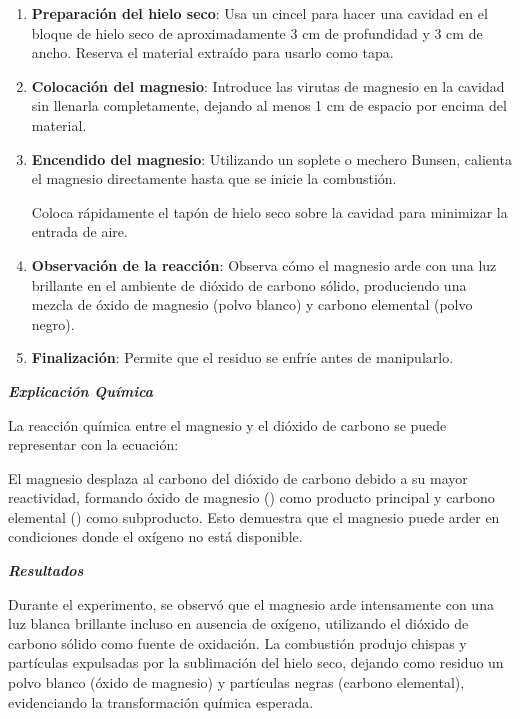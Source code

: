     \begin{enumerate}
        \item \textbf{Preparación del hielo seco}: Usa un cincel para hacer una cavidad en el bloque de hielo seco de aproximadamente 3 cm de profundidad y 3 cm de ancho. Reserva el material extraído para usarlo como tapa.  
    
        \item \textbf{Colocación del magnesio}: Introduce las virutas de magnesio en la cavidad sin llenarla completamente, dejando al menos 1 cm de espacio por encima del material. 
    
        \item \textbf{Encendido del magnesio}: Utilizando un soplete o mechero Bunsen, calienta el magnesio directamente hasta que se inicie la combustión.
        
        Coloca rápidamente el tapón de hielo seco sobre la cavidad para minimizar la entrada de aire. 
    
        \item \textbf{Observación de la reacción}: Observa cómo el magnesio arde con una luz brillante en el ambiente de dióxido de carbono sólido, produciendo una mezcla de óxido de magnesio (polvo blanco) y carbono elemental (polvo negro).

        \item \textbf{Finalización}: Permite que el residuo se enfríe antes de manipularlo.
    \end{enumerate}
    \textit{\textbf{Explicación Química}}  
    
    La reacción química entre el magnesio y el dióxido de carbono se puede representar con la ecuación:
    
    \begin{center}
    \end{center}
    
    El magnesio desplaza al carbono del dióxido de carbono debido a su mayor reactividad, formando óxido de magnesio () como producto principal y carbono elemental () como subproducto. Esto demuestra que el magnesio puede arder en condiciones donde el oxígeno no está disponible. 
    
    \textit{\textbf{Resultados }} 
    
    Durante el experimento, se observó que el magnesio arde intensamente con una luz blanca brillante incluso en ausencia de oxígeno, utilizando el dióxido de carbono sólido como fuente de oxidación. La combustión produjo chispas y partículas expulsadas por la sublimación del hielo seco, dejando como residuo un polvo blanco (óxido de magnesio) y partículas negras (carbono elemental), evidenciando la transformación química esperada. 
    

